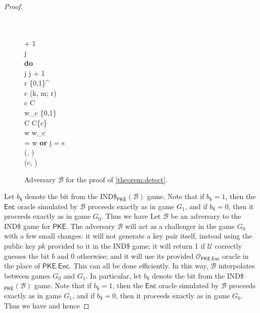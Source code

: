 \begin{proof}
\begin{figure}
\begin{pchstack}
\begin{pcvstack}
{	\pcind {} \\
	\pcelse \\
	\pcind \sigma \leftarrow \sigma + 1 \\
	j  \\
	\textbf{do} \\
	\pcind j \leftarrow j + 1 \\
	\pcind r \sample \{0,1\}^ \\
	\pcind c \leftarrow {}(k, m; r) \\
	\pcind \pcif c \notin C \pcthen \\
	\pcind \pcind w_c \sample \{0,1\} \\
	\pcind \pcind C \leftarrow C\cup \{c\} \\
	\pcind w \leftarrow w_c \\
	\pcuntil \kappa[\sigma] = w \textbf{ or } j = s \\
	\tau \leftarrow (\sigma, \kappa) \\
	\pcreturn (c, \tau)
}
\end{pcvstack}
\end{pchstack}
\caption[Adversary $\mathcal{B}$ for the proof of \autoref{theorem:detect}]{Adversary $\mathcal{B}$ for the proof of \autoref{theorem:detect}.}
\label{game:B}
\end{figure}

Let $b_\$$ denote the bit from the IND\$$_\mathsf{PKE}(\mathcal{B})$ game. Note that if $b_\$=1$, then the $\mathsf{Enc}$ oracle simulated by $\mathcal{B}$ proceeds exactly as in game $G_1$, and if  $b_\$=0$, then it proceeds exactly as in game $G_0$. Thus we have
\else
Let $\mathcal{B}$ be an adversary to the IND\$ game for $\mathsf{PKE}$. The adversary $\mathcal{B}$ will act as a challenger in the game $G_0$ with a few small changes: it will not generate a key pair itself, instead using the public key $pk$ provided to it in the IND\$ game; it will return 1 if $\mathcal{U}$ correctly guesses the bit $b$ and 0 otherwise; and it will use its provided $\mathcal{O}_\mathsf{PKE.Enc}$ oracle in the place of $\mathsf{PKE.Enc}$. This can all be done efficiently. In this way, $\mathcal{B}$ interpolates between games $G_0$ and $G_1$. In particular, let $b_\$$ denote the bit from the IND\$$_\mathsf{PKE}(\mathcal{B})$ game. Note that if $b_\$=1$, then the $\mathsf{Enc}$ oracle simulated by $\mathcal{B}$ proceeds exactly as in game $G_1$, and if  $b_\$=0$, then it proceeds exactly as in game $G_0$. Thus we have
\fi
{}
and hence


\end{proof}
